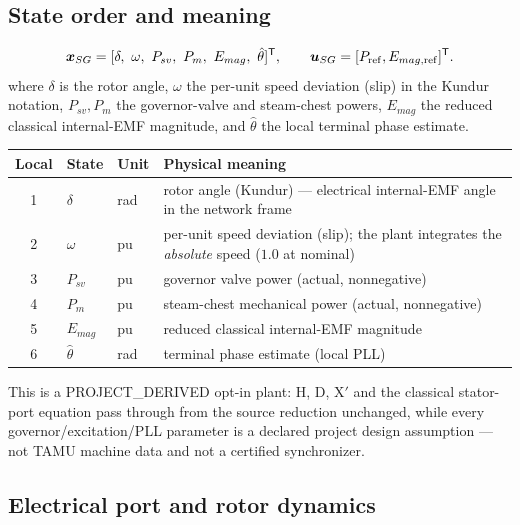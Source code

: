 \subsection{State order and meaning}

\[
\vect x_{SG}=[\delta,\ \omega,\ P_{sv},\ P_m,\ E_{mag},\ \hat\theta]^{\mathsf T},
\qquad \vect u_{SG}=[P_{\rm ref},E_{mag,\rm ref}]^{\mathsf T}.
\]
where $\delta$ is the rotor angle, $\omega$ the per-unit speed deviation (slip)
in the Kundur notation, $P_{sv},P_m$ the governor-valve and steam-chest powers,
$E_{mag}$ the reduced classical internal-EMF magnitude, and $\hat\theta$ the
local terminal phase estimate.
\begin{center}\footnotesize
\begin{tabularx}{\textwidth}{c l l X}
\toprule
Local & State & Unit & Physical meaning\\\midrule
1 & $\delta$ & rad & rotor angle (Kundur) --- electrical internal-EMF angle in the network frame\\
2 & $\omega$ & pu & per-unit speed deviation (slip); the plant integrates the \emph{absolute} speed ($1.0$ at nominal)\\
3 & $P_{sv}$ & pu & governor valve power (actual, nonnegative)\\
4 & $P_m$ & pu & steam-chest mechanical power (actual, nonnegative)\\
5 & $E_{mag}$ & pu & reduced classical internal-EMF magnitude\\
6 & $\hat\theta$ & rad & terminal phase estimate (local PLL)\\
\bottomrule
\end{tabularx}
\end{center}
This is a PROJECT\_DERIVED opt-in plant: H, D, X$'$ and the classical
stator-port equation pass through from the source reduction unchanged, while
every governor/excitation/PLL parameter is a declared project design
assumption --- not TAMU machine data and not a certified synchronizer.

\subsection{Electrical port and rotor dynamics}

